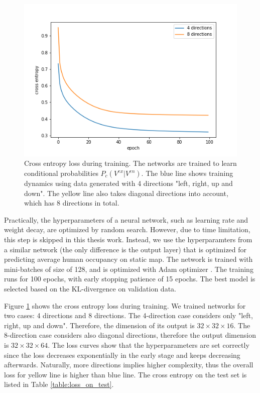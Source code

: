 \begin{figure}[ht]
  \centering
    \includegraphics[width=.7\textwidth]{figures/training_hist.png}
    \caption{Cross entropy loss during training. The networks are trained to learn conditional probabilities \( P_c(V^{ex} | V^{en}) \). The blue line shows training dynamics using data generated with 4 directions "left, right, up and down". The yellow line also takes diagonal directions into account, which has 8 directions in total. }
    \label{fig:trainning}
\end{figure}

Practically, the hyperparameters of a neural network, such as learning rate and weight decay, are optimized by random search. However, due to time limitation, this step is skipped in this thesis work. Instead, we use the hyperparamters from a similar network (the only difference is the output layer) that is optimized for predicting average human occupancy on static map. The network is trained with mini-batches of size of 128, and  is optimized with Adam optimizer \citep{Kingma2014Adam}. The training runs for 100 epochs, with early stopping patience of 15 epochs. The best model is selected based on the KL-divergence on validation data.

 Figure \ref{fig:trainning} shows the cross entropy loss during training. We trained networks for two cases: 4 directions and 8 directions. The 4-direction case considers only "left, right, up and down". Therefore, the dimension of its output is $32 \times 32 \times 16$. The 8-direction case considers also diagonal directions, therefore the output dimension is $32 \times 32 \times 64$. The loss curves show that the hyperparameters are set correctly since the loss decreases exponentially in the early stage and keeps decreasing afterwards. Naturally, more directions implies higher complexity, thus the overall loss for yellow line is higher than blue line. The cross entropy on the test set is listed in Table \ref{table:loss_on_test}.


